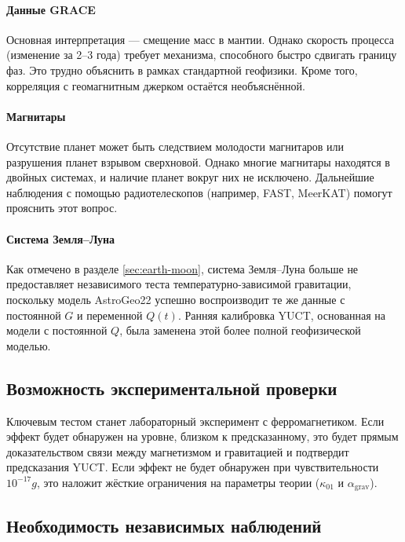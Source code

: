 \documentclass[12pt]{article}
\theoremstyle{remark}
\begin{document}
	\paragraph{Данные GRACE}
	Основная интерпретация \cite{Rosat2025} — смещение масс в мантии. Однако скорость процесса (изменение за 2–3 года) требует механизма, способного быстро сдвигать границу фаз. Это трудно объяснить в рамках стандартной геофизики. Кроме того, корреляция с геомагнитным джерком остаётся необъяснённой.
	
	\paragraph{Магнитары}
	Отсутствие планет может быть следствием молодости магнитаров или разрушения планет взрывом сверхновой. Однако многие магнитары находятся в двойных системах, и наличие планет вокруг них не исключено. Дальнейшие наблюдения с помощью радиотелескопов (например, FAST, MeerKAT) помогут прояснить этот вопрос.
	
	\paragraph{Система Земля–Луна}
	Как отмечено в разделе \ref{sec:earth-moon}, система Земля–Луна больше не предоставляет независимого теста температурно-зависимой гравитации, поскольку модель AstroGeo22 успешно воспроизводит те же данные с постоянной $G$ и переменной $Q(t)$. Ранняя калибровка YUCT, основанная на модели с постоянной $Q$, была заменена этой более полной геофизической моделью.
	
	\subsection{Возможность экспериментальной проверки}
	\label{subsec:discussion-experiment}
	
	Ключевым тестом станет лабораторный эксперимент с ферромагнетиком. Если эффект будет обнаружен на уровне, близком к предсказанному, это будет прямым доказательством связи между магнетизмом и гравитацией и подтвердит предсказания YUCT. Если эффект не будет обнаружен при чувствительности $10^{-17}g$, это наложит жёсткие ограничения на параметры теории ($\kappa_{01}$ и $\alpha_{\text{grav}}$).
	
	\subsection{Необходимость независимых наблюдений}
	\label{subsec:discussion-independent}
	
\end{document}
